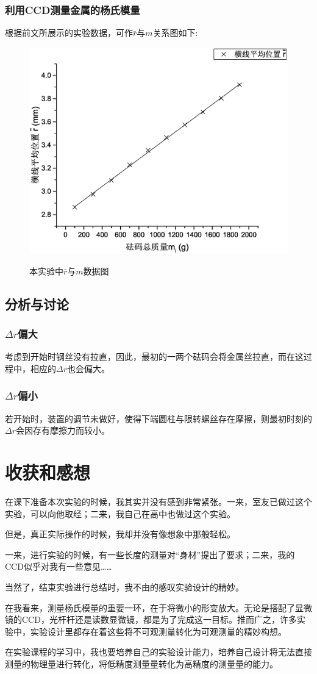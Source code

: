 \documentclass{ctexart}
\begin{document}
\subsubsection{利用CCD测量金属的杨氏模量}
根据前文所展示的实验数据，可作$\bar{r}$与$m$关系图如下:
\begin{figure}[H]
  \centering
  \caption{本实验中$\bar{r}$与$m$数据图}
  \includegraphics[width=\textwidth]{1}
  \label{fig:digit}
\end{figure}

\subsection{分析与讨论}
\subsubsection{$\Delta r$偏大}考虑到开始时钢丝没有拉直，因此，最初的一两个砝码会将金属丝拉直，而在这过程中，相应的$\Delta r$也会偏大。
\subsubsection{$\Delta r$偏小}若开始时，装置的调节未做好，使得下端圆柱与限转螺丝存在摩擦，则最初时刻的$\Delta r$会因存有摩擦力而较小。
\section{收获和感想}
在课下准备本次实验的时候，我其实并没有感到非常紧张。一来，室友已做过这个实验，可以向他取经；二来，我自己在高中也做过这个实验。

但是，真正实际操作的时候，我却并没有像想象中那般轻松。

一来，进行实验的时候，有一些长度的测量对“身材”提出了要求；二来，我的CCD似乎对我有一些意见……

当然了，结束实验进行总结时，我不由的感叹实验设计的精妙。

在我看来，测量杨氏模量的重要一环，在于将微小的形变放大。无论是搭配了显微镜的CCD，光杆杆还是读数显微镜，都是为了完成这一目标。推而广之，许多实验中，实验设计里都存在着这些将不可观测量转化为可观测量的精妙构想。

在实验课程的学习中，我也要培养自己的实验设计能力，培养自己设计将无法直接测量的物理量进行转化，将低精度测量量转化为高精度的测量量的能力。
    
\end{document}
